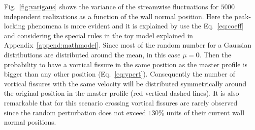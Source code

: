 \documentclass[aps,reprint,amsmath,amssymb,pra]{revtex4-1}%
\begin{document}
Fig.~\ref{fig:varigaus} shows the variance of the streamwise fluctuations for $5000$ independent realizations as a function of the wall normal position. Here the peak-locking phenomena is more evident and it is explained by use the Eq.~\ref{eq:coeff} and considering the special rules in the toy model explained in Appendix~\ref{append:mathmodel}. Since most of the random number for a Gaussian distributions are distributed around the mean, in this case $\mu=0$. Then the probability to have a vortical fissure in the same position as the master profile is bigger than any other position (Eq.~\ref{eq:ypert}). Consequently the number of vortical fissures with the same velocity will be distributed symmetrically around the original position in the master profile (red vertical dashed lines). It is also remarkable that for this scenario crossing vortical fissures are rarely observed since the random perturbation does not exceed $130\%$ units of their current wall normal positions. 
\end{document}
